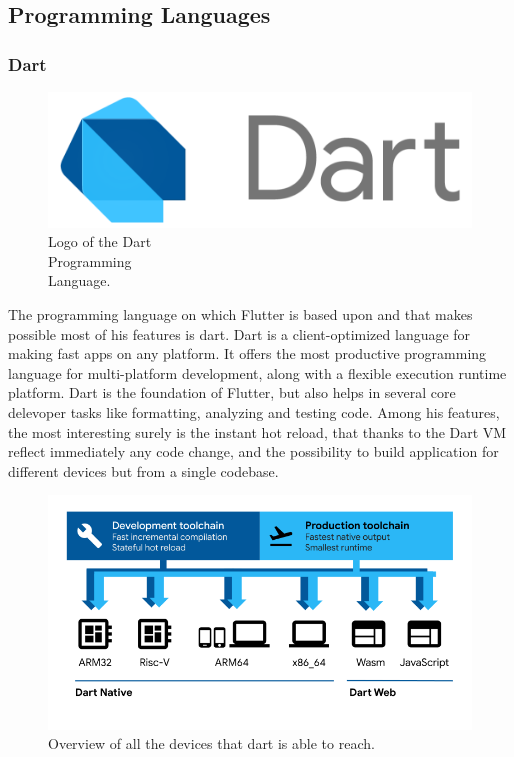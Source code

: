 \subsection{Programming Languages}
\subsubsection{Dart}
\label{subsubsec:dart}

\begin{figure} %
    \captionsetup{font=footnotesize}
    \centering
    \includegraphics[width=\linewidth]{images/dart.png}
    \caption{Logo of the Dart\\Programming\\Language.}
\end{figure}

The programming language on which Flutter is based upon and that makes possible most of his features is dart. Dart is a client-optimized language for making fast apps on any platform. It offers the most productive programming language for multi-platform development, along with a flexible execution runtime platform. Dart is the foundation of Flutter, but also helps in several core delevoper tasks like formatting, analyzing and testing code. Among his features, the most interesting surely is the instant hot reload, that thanks to the Dart VM reflect immediately any code change, and the possibility to build application for different devices but from a single codebase. 

\begin{figure}
    \includegraphics[width=1.0\linewidth]{./images/dart_platforms.png}
    \caption{Overview of all the devices that dart is able to reach.}
    \label{fig:dartPlatforms}
\end{figure}

